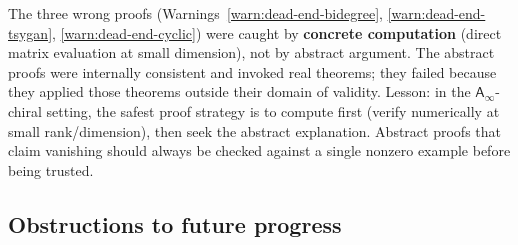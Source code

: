 \documentclass[11pt]{article}
\newcommand{\Ainf}{\mathsf{A}_{\infty}}
\begin{document}
\begin{remark}
\label{rem:wrong-proofs-valuable}
The three wrong proofs (Warnings~\ref{warn:dead-end-bidegree},
\ref{warn:dead-end-tsygan}, \ref{warn:dead-end-cyclic}) were
caught by \textbf{concrete computation} (direct matrix evaluation
at small dimension), not by abstract argument. The abstract proofs
were internally consistent and invoked real theorems; they failed
because they applied those theorems outside their domain of validity.
Lesson: in the $\Ainf$-chiral setting, the safest proof strategy
is to compute first (verify numerically at small rank/dimension),
then seek the abstract explanation. Abstract proofs that claim
vanishing should always be checked against a single nonzero example
before being trusted.
\end{remark}

\subsection{Obstructions to future progress}
\label{subsec:obstructions-future}
\end{document}
